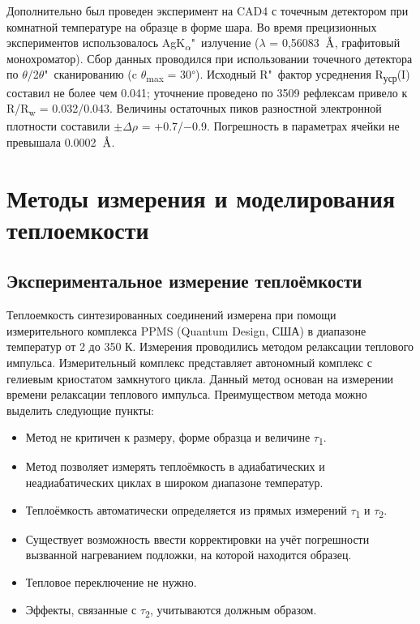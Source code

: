 Дополнительно был проведен эксперимент на CAD4 с точечным детектором при комнатной температуре на образце в форме шара. Во время прецизионных экспериментов использовалось AgK\textsubscript{$\alpha$}"~излучение ($\lambda$ = 0,56083~${\mbox{\normalfont\AA}}$, графитовый монохроматор). Сбор данных проводился при использовании точечного детектора по $\theta$/2$\theta$"~сканированию (c $\theta$\textsubscript{max} = 30\textsuperscript{$\circ$}).
Исходный R"~фактор усреднения R\textsubscript{уср}(I) составил не более чем  0.041; уточнение проведено по 3509 рефлексам привело к R/R\textsubscript{w} = 0.032/0.043.
Величины остаточных пиков разностной электронной плотности составили $\pm\Delta$$\rho$ = +0.7/$-$0.9.
Погрешность в параметрах ячейки не превышала 0.0002~{$\mbox{\normalfont\AA}$}.

\newpage
\section{Методы измерения и моделирования теплоемкости} \label{sect2_4}
\subsection{Экспериментальное измерение теплоёмкости}\label{sect2_4_1}
Теплоемкость синтезированных соединений измерена при помощи измерительного комплекса PPMS (Quantum Design,
США) в диапазоне температур от 2 до 350 К. Измерения проводились методом релаксации теплового
импульса\cite{Hwang_1997}. Измерительный комплекс представляет автономный комплекс с гелиевым криостатом замкнутого цикла. Данный метод основан на измерении времени релаксации теплового импульса. Преимуществом метода можно выделить следующие пункты:
\begin{itemize}
\item Метод не критичен к размеру, форме образца и величине $\tau$\textsubscript{1}.

\item Метод позволяет измерять теплоёмкость в адиабатических и неадиабатических циклах в широком диапазоне температур.

\item Теплоёмкость автоматически определяется из прямых измерений  $\tau$\textsubscript{1} и $\tau$\textsubscript{2}.

\item Существует возможность ввести корректировки на учёт погрешности вызванной нагреванием подложки, на которой находится образец.

\item Тепловое переключение не нужно.

\item Эффекты, связанные с $\tau$\textsubscript{2}, учитываются должным образом.
\end{itemize}



